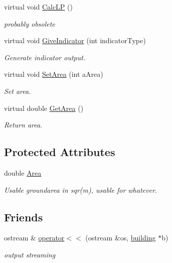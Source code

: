 \begin{DoxyCompactItemize}
virtual void \hyperlink{classbuilding_af1f27cbf72295547af61edc9e02a7e61}{CalcLP} ()
\begin{DoxyCompactList}\small\item\em probably obsolete \item\end{DoxyCompactList}\item 
virtual void \hyperlink{classbuilding_ae0e21d6fc26978c65a980676ddf4fcdf}{GiveIndicator} (int indicatorType)
\begin{DoxyCompactList}\small\item\em Generate indicator output. \item\end{DoxyCompactList}\item 
virtual void \hyperlink{classbuilding_a5c0a02ae89842962b07ca544b4c43cd4}{SetArea} (int aArea)
\begin{DoxyCompactList}\small\item\em Set area. \item\end{DoxyCompactList}\item 
virtual double \hyperlink{classbuilding_a930bf40915b04b091ce5fa00cf15c58e}{GetArea} ()
\begin{DoxyCompactList}\small\item\em Return area. \item\end{DoxyCompactList}\end{DoxyCompactItemize}
\subsection*{Protected Attributes}
\begin{DoxyCompactItemize}
\item 
double \hyperlink{classbuilding_aa68e50d312e05ff1e342393d21c9f3cb}{Area}
\begin{DoxyCompactList}\small\item\em Usable groundarea in sqr(m), usable for whatever. \item\end{DoxyCompactList}\end{DoxyCompactItemize}
\subsection*{Friends}
\begin{DoxyCompactItemize}
\item 
ostream \& \hyperlink{classbuilding_a47f4f2ec998d1300d4ccd788b0a668ca}{operator$<$$<$} (ostream \&os, \hyperlink{classbuilding}{building} $\ast$b)
\begin{DoxyCompactList}\small\item\em output streaming \item\end{DoxyCompactList}\end{DoxyCompactItemize}


